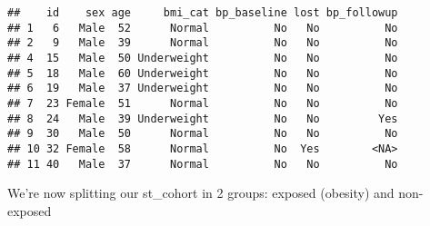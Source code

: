 \documentclass[
]{article}
\newenvironment{Shaded}{\begin{snugshade}}{\end{snugshade}}
\newcommand{\CommentTok}[1]{\textcolor[rgb]{0.56,0.35,0.01}{\textit{#1}}}
\newcommand{\NormalTok}[1]{#1}
\newcommand{\OtherTok}[1]{\textcolor[rgb]{0.56,0.35,0.01}{#1}}
\newcommand{\SpecialCharTok}[1]{\textcolor[rgb]{0.81,0.36,0.00}{\textbf{#1}}}
\newcommand{\StringTok}[1]{\textcolor[rgb]{0.31,0.60,0.02}{#1}}
\begin{document}
\begin{verbatim}
##    id    sex age     bmi_cat bp_baseline lost bp_followup
## 1   6   Male  52      Normal          No   No          No
## 2   9   Male  39      Normal          No   No          No
## 4  15   Male  50 Underweight          No   No          No
## 5  18   Male  60 Underweight          No   No          No
## 6  19   Male  37 Underweight          No   No          No
## 7  23 Female  51      Normal          No   No          No
## 8  24   Male  39 Underweight          No   No         Yes
## 9  30   Male  50      Normal          No   No          No
## 10 32 Female  58      Normal          No  Yes        <NA>
## 11 40   Male  37      Normal          No   No          No
\end{verbatim}

\begin{Shaded}
\end{Shaded}

We're now splitting our st\_cohort in 2 groups: exposed (obesity) and
non-exposed

\begin{Shaded}
\end{Shaded}
\end{document}
